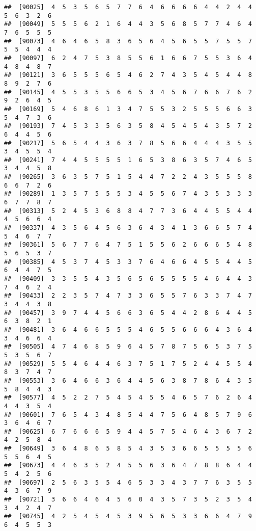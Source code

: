 \documentclass[
]{book}
\begin{document}
\begin{verbatim}
##  [90025]  4  5  3  5  6  5  7  7  6  4  6  6  6  6  4  4  2  4  4  5  6  3  2  6
##  [90049]  5  5  5  6  2  1  6  4  4  3  5  6  8  5  7  7  4  6  4  7  6  5  5  5
##  [90073]  4  6  4  6  5  8  3  6  5  6  4  5  6  5  5  7  5  5  7  5  5  4  4  4
##  [90097]  6  2  4  7  5  3  8  5  5  6  1  6  6  7  5  5  3  6  4  4  8  4  8  7
##  [90121]  3  6  5  5  5  6  5  4  6  2  7  4  3  5  4  5  4  4  8  8  9  2  7  6
##  [90145]  4  5  5  3  5  5  6  6  5  3  4  5  6  7  6  6  7  6  2  9  2  6  4  5
##  [90169]  5  4  6  8  6  1  3  4  7  5  5  3  2  5  5  5  6  6  3  5  4  7  3  6
##  [90193]  7  4  5  3  3  5  6  3  5  8  4  5  4  5  4  3  5  7  2  6  4  4  5  6
##  [90217]  5  6  5  4  4  3  6  3  7  8  5  6  6  4  4  4  3  5  5  3  4  5  5  4
##  [90241]  7  4  4  5  5  5  5  1  6  5  3  8  6  3  5  7  4  6  5  3  4  4  5  8
##  [90265]  3  6  3  5  7  5  1  5  4  4  7  2  2  4  3  5  5  5  8  6  6  7  2  6
##  [90289]  1  3  5  7  5  5  5  3  4  5  5  6  7  4  3  5  3  3  3  6  7  7  8  7
##  [90313]  5  2  4  5  3  6  8  8  4  7  7  3  6  4  4  5  5  4  4  4  5  6  6  4
##  [90337]  4  3  5  6  4  5  6  3  6  4  3  4  1  3  6  6  5  7  4  5  4  6  7  7
##  [90361]  5  6  7  7  6  4  7  5  1  5  5  6  2  6  6  6  5  4  8  5  6  5  3  7
##  [90385]  4  5  3  7  4  5  3  3  7  6  4  6  6  4  5  5  4  4  5  6  4  4  7  5
##  [90409]  3  3  5  5  4  3  5  6  5  6  5  5  5  5  4  6  4  4  3  7  4  6  2  4
##  [90433]  2  2  3  5  7  4  7  3  3  6  5  5  7  6  3  3  7  4  7  3  4  4  3  8
##  [90457]  3  9  7  4  4  5  6  6  3  6  5  4  4  2  8  6  4  4  5  6  3  8  2  1
##  [90481]  3  6  4  6  6  5  5  5  4  6  5  5  6  6  6  4  3  6  4  3  4  6  6  4
##  [90505]  4  7  4  6  8  5  9  6  4  5  7  8  7  5  6  5  3  7  5  5  3  5  6  7
##  [90529]  5  5  4  6  4  4  6  3  7  5  1  7  5  2  4  4  5  5  4  8  3  7  4  7
##  [90553]  3  6  4  6  6  3  6  4  4  5  6  3  8  7  8  6  4  3  5  5  8  4  4  3
##  [90577]  4  5  2  2  7  5  4  5  4  5  5  4  6  5  7  6  2  6  4  4  4  3  5  4
##  [90601]  7  6  5  4  3  4  8  5  4  4  7  5  6  4  8  5  7  9  6  3  6  4  6  7
##  [90625]  6  7  6  6  6  5  9  4  4  5  7  5  4  6  4  3  6  7  2  4  2  5  8  4
##  [90649]  3  6  4  8  6  5  8  5  4  3  5  3  6  6  5  5  5  5  6  5  5  6  4  5
##  [90673]  4  4  6  3  5  2  4  5  5  6  3  6  4  7  8  8  6  4  4  5  4  2  5  6
##  [90697]  2  5  6  3  5  5  4  6  5  3  3  4  3  7  7  6  3  5  5  4  3  6  7  9
##  [90721]  3  6  6  4  6  4  5  6  0  4  3  5  7  3  5  2  3  5  4  3  4  2  4  7
##  [90745]  4  2  5  4  5  4  5  3  9  5  6  5  3  3  6  6  4  7  9  6  4  5  5  3

\end{verbatim}
\end{document}
